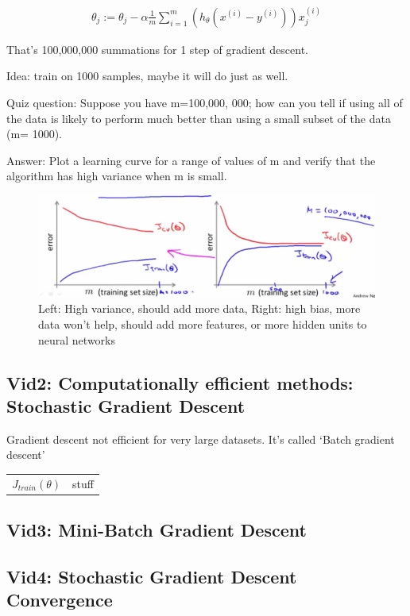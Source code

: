 \documentclass[fontsize=11]{article}
\begin{document}
\begin{align*}
\theta_j := \theta_j - \alpha \frac{1}{m} \sum_{i=1}^m (h_{\theta}(x^{(i)} - y^{(i)}))x_j^{(i)}
\end{align*}

That's 100,000,000 summations for 1 step of gradient descent.

Idea: train on 1000 samples, maybe it will do just as well. 

Quiz question: Suppose you have m=100,000, 000; how can you tell if using all of the data is likely to perform much better than using a small subset of the data (m= 1000).

Answer: Plot a learning curve for a range of values of m and verify that the algorithm has high variance when m is small. 

\begin{figure}
\includegraphics[scale=0.3]{./figures/learning_curves.png}
\caption{Left: High variance, should add more data, Right: high bias, more data won't help, should add more features, or more hidden units to neural networks}
\end{figure}


\subsection{Vid2: Computationally efficient methods: Stochastic Gradient Descent}
Gradient descent not efficient for very large datasets.
It's called `Batch gradient descent'


\begin{tabularx}{\linewidth}{l|X|}
$ J_{train}(\theta) $ & stuff 
\end{tabularx}

 


\subsection{Vid3: Mini-Batch Gradient Descent}

\subsection{Vid4: Stochastic Gradient Descent Convergence}
\end{document}
